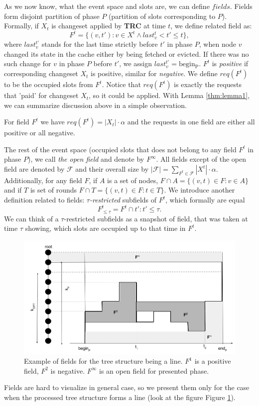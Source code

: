 As we now know, what the event space and slots are, we can define $fields$. Fields 
form disjoint partition of phase $P$ (partition of slots corresponding 
to $P$). Formally, if $X_t$ is changeset applied by \textbf{TRC} at time $t$, we 
define related field as:
$$F^t = \{(v, t'): v \in X^t \wedge last_v^t < t' \leq t\},$$
where $last_v^{t'}$ stands for the last time strictly before $t'$ in phase $P$, 
when node $v$ changed its state in the cache either by being fetched or evicted. If 
there was no such change for $v$ in phase $P$ before $t'$, we assign 
$last_v^{t'} = \mathrm{begin_P}$. $F^t$ is \textit{positive} if corresponding 
changeset $X_t$ is positive, similar for \textit{negative}. We define $req(F^t)$ 
to be the occupied slots from $F^t$. Notice that $req(F^t)$ is exactly the
requests that 'paid' for changeset $X_t$, so it could be applied. With Lemma \ref{thm:lemma1},
we can summarize discussion above in a simple observation.
\begin{observe}
For field $F^t$ we have $req(F^t) = |X_t| \cdot \alpha$ and the requests 
in one field are either all positive or all negative.
\label{obs:observe1}
\end{observe}
The rest of the event space (occupied slots that does not belong to any field $F^t$ 
in phase $P$), we call \textit{the open field} and denote by $F^{\infty}$. All 
fields except of the open field are denoted by $\mathcal{F}$ and their overall size
by $|\mathcal{F}| = \sum_{F^t \in \mathcal{F}} |X^t| \cdot \alpha$.
Additionally, for any field $F$, if $A$ is a set of nodes, $F \cap A = \{(v,t) 
\in F: v \in A\}$ and if $T$ is set of rounds $F \cap T = \{(v, t) \in F: t \in 
T\}$. We introduce another definition related to fields: $\tau$\textit{-restricted} subfields of 
$F^t$, which formally are equal
$$F^t_{\leq \tau} = F^t \cap {t': t' \leq \tau}.$$
We can think of a $\tau$-restricted subfields as a snapshot of field, that was taken at time $\tau$
showing, which slots are occupied up to that time in $F^t$.
\begin{figure}
\begin{center}
  \includegraphics[width=1.1\textwidth]{fields.png}
\end{center}
\caption{Example of fields for the tree structure being a line. $F^1$ is a positive field, 
$F^2$ is negative. $F^{\infty}$ is an open field for presented phase.}
\label{fig:fields}
\end{figure}
Fields are hard to visualize in general case, so we present them 
only for the case when the processed tree structure forms a line (look at the figure 
Figure \ref{fig:fields}).

